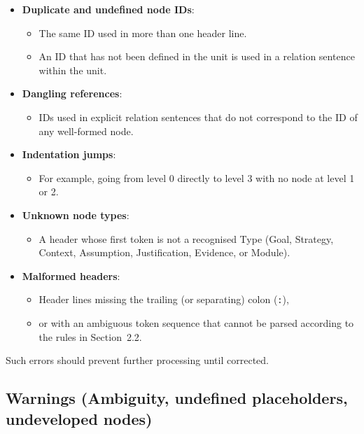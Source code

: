 \documentclass[11pt]{article}
\begin{document}
\begin{itemize}[leftmargin=2em]
  \item \textbf{Duplicate and undefined node IDs}:
  \begin{itemize}[leftmargin=1.5em]
    \item The same ID used in more than one header line.
    \item An ID that has not been defined in the unit is used in a relation sentence within the unit.
  \end{itemize}

  \item \textbf{Dangling references}:
  \begin{itemize}[leftmargin=1.5em]
    \item IDs used in explicit relation sentences that do not correspond to the ID of any well-formed node.
  \end{itemize}

  \item \textbf{Indentation jumps}:
  \begin{itemize}[leftmargin=1.5em]
    \item For example, going from level 0 directly to level 3 with no node at level 1 or 2.
  \end{itemize}

  \item \textbf{Unknown node types}:
  \begin{itemize}[leftmargin=1.5em]
    \item A header whose first token is not a recognised Type (Goal, Strategy, Context, Assumption, Justification, Evidence, or Module).
  \end{itemize}

  \item \textbf{Malformed headers}:
  \begin{itemize}[leftmargin=1.5em]
    \item Header lines missing the trailing (or separating) colon (\texttt{:}),
    \item or with an ambiguous token sequence that cannot be parsed according to the rules in Section~2.2.
  \end{itemize}
\end{itemize}

Such errors should prevent further processing until corrected.

\subsection{Warnings (Ambiguity, undefined placeholders, undeveloped nodes)}
\end{document}
